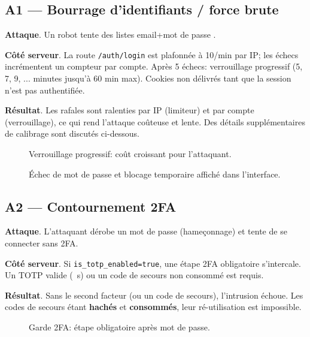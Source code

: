 \subsection*{A1 — Bourrage d'identifiants / force brute}
\textbf{Attaque}. Un robot tente des listes \og email+mot de passe \fg{}.

\textbf{Côté serveur}. La route \texttt{/auth/login} est plafonnée à 10/min par IP; les échecs incrémentent un compteur par compte. Après 5 échecs: verrouillage progressif (5, 7, 9, ... minutes jusqu'à 60 min max). Cookies non délivrés tant que la session n'est pas authentifiée.

\textbf{Résultat}. Les rafales sont ralenties par IP (limiteur) et par compte (verrouillage), ce qui rend l'attaque coûteuse et lente. Des détails supplémentaires de calibrage sont discutés ci-dessous.

\begin{figure}[h]
  \centering
  \caption{Verrouillage progressif: coût croissant pour l'attaquant.}
\end{figure}

\begin{figure}[h]
  \centering
  \caption{Échec de mot de passe et blocage temporaire affiché dans l'interface.}
\end{figure}

\subsection*{A2 — Contournement 2FA}
\textbf{Attaque}. L'attaquant dérobe un mot de passe (hameçonnage) et tente de se connecter sans 2FA.

\textbf{Côté serveur}. Si \texttt{is\_totp\_enabled=true}, une étape 2FA obligatoire s'intercale. Un TOTP valide (~s) ou un code de secours non consommé est requis.

\textbf{Résultat}. Sans le second facteur (ou un code de secours), l'intrusion échoue. Les codes de secours étant \textbf{hachés} et \textbf{consommés}, leur ré-utilisation est impossible.

\begin{figure}[h]
  \centering
  \caption{Garde 2FA: étape obligatoire après mot de passe.}
\end{figure}

